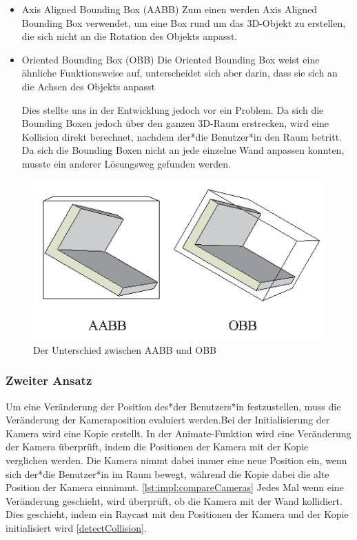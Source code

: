 \begin{itemize}
    \item Axis Aligned Bounding Box (AABB)
    \newline
    Zum einen werden Axis Aligned Bounding Box verwendet, um eine Box rund um das 3D-Objekt zu erstellen, die sich nicht an die Rotation des Objekts anpasst.
    \item Oriented Bounding Box (OBB)
    \newline
    Die Oriented Bounding Box weist eine ähnliche Funktionsweise auf, unterscheidet sich aber darin, dass sie sich an die Achsen des Objekts anpasst
    
    Dies stellte uns in der Entwicklung jedoch vor ein Problem. Da sich die Bounding Boxen jedoch über den ganzen 3D-Raum erstrecken, wird eine Kollision direkt berechnet, nachdem der*die Benutzer*in den Raum betritt. Da sich die Bounding Boxen nicht an jede einzelne Wand anpassen konnten, musste ein anderer Lösungsweg gefunden werden.
\end{itemize}
\begin{figure}
    \centering
    \includegraphics[scale=0.65]{pics/aabb_obb.png}
    \caption{Der Unterschied zwischen AABB und OBB \cite{AABBandOBBPicture}}
    \label{fig:impl:aabb_obb}
\end{figure}


\subsubsection{Zweiter Ansatz}
Um eine Veränderung der Position des*der Benutzers*in festzustellen, muss die Veränderung der Kameraposition evaluiert werden.Bei der Initialisierung der Kamera wird eine Kopie erstellt. In der Animate-Funktion wird eine Veränderung der Kamera überprüft, indem die Positionen der Kamera mit der Kopie verglichen werden. Die Kamera nimmt dabei immer eine neue Position ein, wenn sich der*die Benutzer*in im Raum bewegt, während die Kopie dabei die alte Position der Kamera einnimmt. \ref{lst:impl:compareCameras} Jedes Mal wenn eine Veränderung geschieht, wird überprüft, ob die Kamera mit der Wand kollidiert. Dies geschieht, indem ein Raycast mit den Positionen der Kamera und der Kopie initialisiert wird \ref{detectCollision}. 
     

